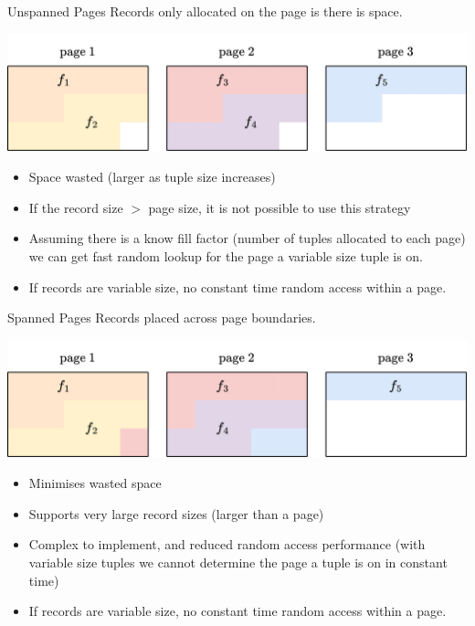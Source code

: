 \begin{definitionbox}{Unspanned Pages}
    Records only allocated on the page is there is space.
    \begin{center}
        \includegraphics[width=.8\textwidth]{storage/images/unspanned_page.drawio.png}
    \end{center}
    \begin{itemize}
        \item Space wasted (larger as tuple size increases)
        \item If the record size $>$ page size, it is not possible to use this strategy
        \item Assuming there is a know fill factor (number of tuples allocated to each page) we can get fast random lookup for the page a variable size tuple is on.
        \item If records are variable size, no constant time random access within a page.
    \end{itemize}
\end{definitionbox}

\begin{definitionbox}{Spanned Pages}
    Records placed across page boundaries.
    \begin{center}
        \includegraphics[width=.8\textwidth]{storage/images/spanned_page.drawio.png}
    \end{center}
    \begin{itemize}
        \item Minimises wasted space
        \item Supports very large record sizes (larger than a page)
        \item Complex to implement, and reduced random access performance (with variable size tuples we cannot determine the page a tuple is on in constant time)
        \item If records are variable size, no constant time random access within a page.
    \end{itemize}
\end{definitionbox}

